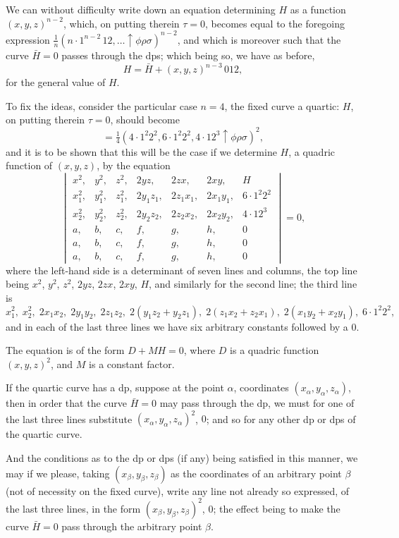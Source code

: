 \documentclass[11pt,a4paper]{book}
\begin{document}
\begin{art}\label{art:43}
We can without difficulty write down an equation determining $H$ as a function $(x, y, z)^{n-2}$, which, on putting therein $\tau = 0$, becomes equal to the foregoing expression $\frac{1}{n}(n \cdot 1^{n-2}\,12, \ldots \uparrow\phi\rho\sigma)^{n-2}$, and which is moreover such that the curve $\bar{H} = 0$ passes through the dps; which being so, we have as before,
\[
H = \bar{H} + (x, y, z)^{n-3}\,012,
\]
for the general value of $H$.

To fix the ideas, consider the particular case $n = 4$, the fixed curve a quartic: $H$, on putting therein $\tau = 0$, should become
\[
= \tfrac{1}{4}(4 \cdot 1^2 2^2, 6 \cdot 1^2 2^2, 4 \cdot 12^3 \uparrow\phi\rho\sigma)^2,
\]
and it is to be shown that this will be the case if we determine $H$, a quadric function of $(x, y, z)$, by the equation
\[
\begin{vmatrix}
x^2, & y^2, & z^2, & 2yz, & 2zx, & 2xy, & H \\
x_1^2, & y_1^2, & z_1^2, & 2y_1z_1, & 2z_1x_1, & 2x_1y_1, & 6 \cdot 1^2 2^2 \\
x_2^2, & y_2^2, & z_2^2, & 2y_2z_2, & 2z_2x_2, & 2x_2y_2, & 4 \cdot 12^3 \\
a, & b, & c, & f, & g, & h, & 0 \\
a, & b, & c, & f, & g, & h, & 0 \\
a, & b, & c, & f, & g, & h, & 0
\end{vmatrix} = 0,
\]
where the left-hand side is a determinant of seven lines and columns, the top line being $x^2$, $y^2$, $z^2$, $2yz$, $2zx$, $2xy$, $H$, and similarly for the second line; the third line is
\[
x_1^2,\; x_2^2,\; 2x_1x_2,\; 2y_1y_2,\; 2z_1z_2,\; 2(y_1z_2 + y_2z_1),\; 2(z_1x_2 + z_2x_1),\; 2(x_1y_2 + x_2y_1),\; 6 \cdot 1^2 2^2,
\]
and in each of the last three lines we have six arbitrary constants followed by a $0$.

The equation is of the form $D + MH = 0$, where $D$ is a quadric function $(x, y, z)^2$, and $M$ is a constant factor.
\end{art}

\newpage
\begin{art}\label{art:44}
If the quartic curve has a dp, suppose at the point $\alpha$, coordinates $(x_\alpha, y_\alpha, z_\alpha)$, then in order that the curve $\bar{H} = 0$ may pass through the dp, we must for one of the last three lines substitute $(x_\alpha, y_\alpha, z_\alpha)^2$, $0$; and so for any other dp or dps of the quartic curve.

And the conditions as to the dp or dps (if any) being satisfied in this manner, we may if we please, taking $(x_\beta, y_\beta, z_\beta)$ as the coordinates of an arbitrary point $\beta$ (not of necessity on the fixed curve), write any line not already so expressed, of the last three lines, in the form $(x_\beta, y_\beta, z_\beta)^2$, $0$; the effect being to make the curve $\bar{H} = 0$ pass through the arbitrary point $\beta$.
\end{art}
\end{document}
